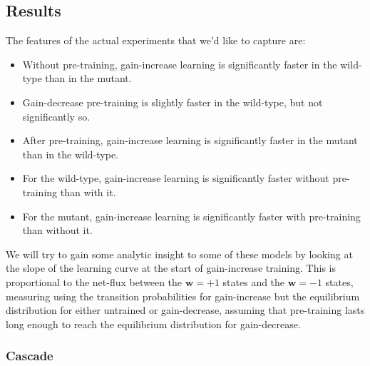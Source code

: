 \documentclass[12pt]{article}
\newcommand{\w}{\mathbf{w}}
\begin{document}
\subsection{Results}\label{sec:results}

The features of the actual experiments that we'd like to capture are:
\begin{itemize}
  \item Without pre-training, gain-increase learning is significantly faster in the wild-type than in the mutant.
  \item Gain-decrease pre-training is slightly faster in the wild-type, but not significantly so.
  \item After pre-training, gain-increase learning is significantly faster in the mutant than in the wild-type.
  \item For the wild-type, gain-increase learning is significantly faster without pre-training than with it.
  \item For the mutant, gain-increase learning is significantly faster with pre-training than without it.
\end{itemize}

We will try to gain some analytic insight to some of these models by looking at the slope of the learning curve at the start of gain-increase training.
This is proportional to the net-flux between the $\w=+1$ states and the $\w=-1$ states, measuring using the transition probabilities for gain-increase but the equilibrium distribution for either untrained or gain-decrease, assuming that pre-training lasts long enough to reach the equilibrium distribution for gain-decrease.


\subsubsection{Cascade}\label{sec:cascade}
\end{document}
